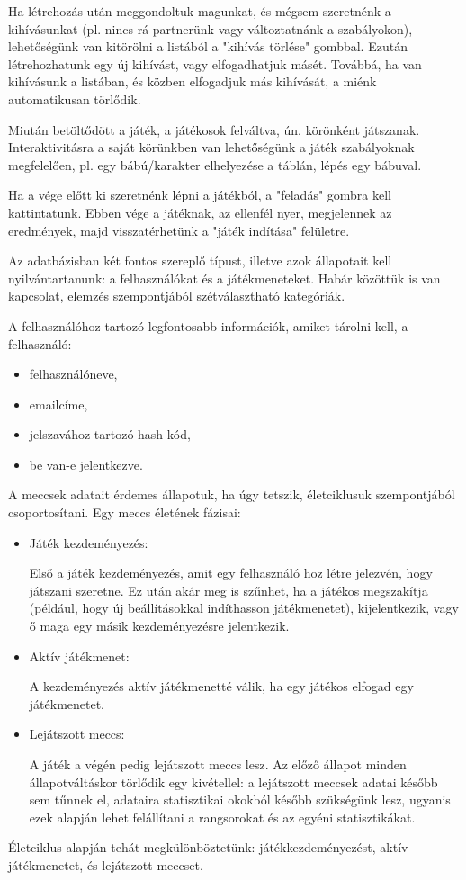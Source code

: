 Ha létrehozás után meggondoltuk magunkat, és mégsem szeretnénk a kihívásunkat (pl. nincs rá partnerünk vagy változtatnánk a szabályokon), lehetőségünk van kitörölni a listából a "kihívás törlése" gombbal. Ezután létrehozhatunk egy új kihívást, vagy elfogadhatjuk másét.
Továbbá, ha van kihívásunk a listában, és közben elfogadjuk más kihívását, a miénk automatikusan törlődik.

Miután betöltődött a játék, a játékosok felváltva, ún. körönként játszanak. Interaktivitásra a saját körünkben van lehetőségünk a játék szabályoknak megfelelően, pl. egy bábú/karakter elhelyezése a táblán, lépés egy bábuval.

Ha a vége előtt ki szeretnénk lépni a játékból, a "feladás" gombra kell kattintatunk. Ebben vége a játéknak, az ellenfél nyer, megjelennek az eredmények, majd visszatérhetünk a "játék indítása" felületre.





Az adatbázisban két fontos szereplő típust, illetve azok állapotait kell nyilvántartanunk: a felhasználókat és a játékmeneteket. Habár közöttük is van kapcsolat, elemzés szempontjából szétválasztható kategóriák.

A felhasználóhoz tartozó legfontosabb információk, amiket tárolni kell, a felhasználó:
\begin{itemize}
	\item felhasználóneve,
	\item emailcíme,
	\item jelszavához tartozó hash kód,
	\item be van-e jelentkezve.
\end{itemize}

A meccsek adatait érdemes állapotuk, ha úgy tetszik, életciklusuk szempontjából csoportosítani. Egy meccs életének fázisai:
\begin{itemize}
	\item Játék kezdeményezés:
	
	Első a játék kezdeményezés, amit egy felhasználó hoz létre jelezvén, hogy játszani szeretne.
	Ez után akár meg is szűnhet, ha a játékos megszakítja (például, hogy új beállításokkal indíthasson játékmenetet), kijelentkezik, vagy ő maga egy másik kezdeményezésre jelentkezik.
	\item Aktív játékmenet:
	
	A kezdeményezés aktív játékmenetté válik, ha egy játékos elfogad egy játékmenetet.
	\item Lejátszott meccs:
	
	A játék a végén pedig lejátszott meccs lesz. Az előző állapot minden állapotváltáskor törlődik egy kivétellel: a lejátszott meccsek adatai később sem tűnnek el, adataira statisztikai okokból később szükségünk lesz, ugyanis ezek alapján lehet felállítani a rangsorokat és az egyéni statisztikákat.
\end{itemize}
Életciklus alapján tehát megkülönböztetünk: játékkezdeményezést, aktív játékmenetet, és lejátszott meccset.

